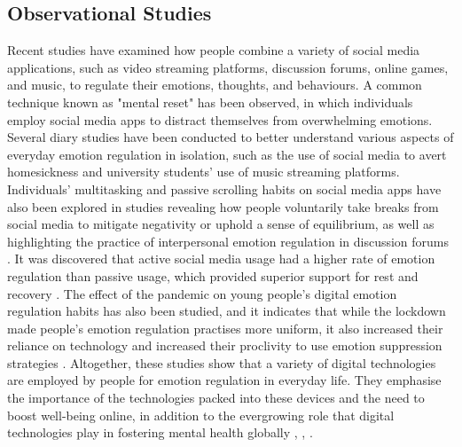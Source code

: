 \documentclass[lettersize,journal]{IEEEtran}
\begin{document}
\subsection{Observational Studies}
Recent studies have examined how people combine a variety of social media applications, such as video streaming platforms, discussion forums, online games, and music, to regulate their emotions, thoughts, and behaviours. A common technique known as "mental reset" has been observed, in which individuals employ social media apps to distract themselves from overwhelming emotions. Several diary studies have been conducted to better understand various aspects of everyday emotion regulation in isolation, such as the use of social media to avert homesickness and university students' use of music streaming platforms. Individuals' multitasking and passive scrolling habits on social media apps have also been explored in studies revealing how people voluntarily take breaks from social media to mitigate negativity or uphold a sense of equilibrium, as well as highlighting the practice of interpersonal emotion regulation in discussion forums \cite{smith2022digital}. It was discovered that active social media usage had a higher rate of emotion regulation than passive usage, which provided superior support for rest and recovery \cite{hossain2022motivational}. The effect of the pandemic on young people's digital emotion regulation habits has also been studied, and it indicates that while the lockdown made people's emotion regulation practises more uniform, it also increased their reliance on technology and increased their proclivity to use emotion suppression strategies \cite{tag2022impact}. %
Altogether, these studies show that a variety of digital technologies are employed by people for emotion regulation in everyday life. They emphasise the importance of the technologies packed into these devices and the need to boost well-being online, in addition to the evergrowing role that digital technologies play in fostering mental health globally \cite{slovak2022designing}, \cite{wadley2020digital}, \cite{smith2022digital}.

  
  
\end{document}
